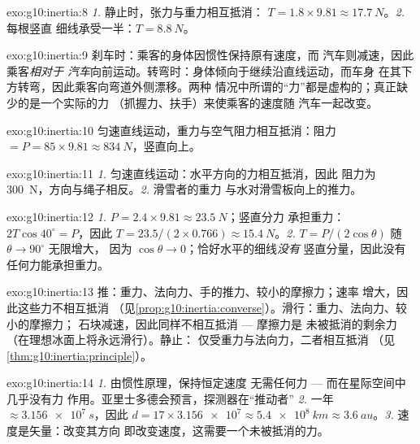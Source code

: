 \begin{solution}{exo:g10:inertia:8}
\emph{1.} 静止时，张力与重力相互抵消：
$T = 1.8 \times 9.81 \approx \qty{17.7}{N}$。\emph{2.} 每根竖直
细线承受一半：$T = \qty{8.8}{N}$。
\end{solution}

\begin{solution}{exo:g10:inertia:9}
刹车时：乘客的身体因惯性保持原有速度，而
汽车则减速，因此乘客\emph{相对于
汽车}向前运动。转弯时：身体倾向于继续沿直线运动，而车身
在其下方转弯，因此乘客向弯道外侧漂移。两种
情况中所谓的“力”都是虚构的；真正缺少的是一个实际的力
（抓握力、扶手）来使乘客的速度随
汽车一起改变。
\end{solution}

\begin{solution}{exo:g10:inertia:10}
匀速直线运动，重力与空气阻力相互抵消：阻力
$= P = 85 \times 9.81 \approx \qty{834}{N}$，竖直向上。
\end{solution}

\begin{solution}{exo:g10:inertia:11}
\emph{1.} 匀速直线运动：水平方向的力相互抵消，因此
阻力为 \qty{300}{N}，方向与绳子相反。\emph{2.} 滑雪者的重力
与水对滑雪板向上的推力。
\end{solution}

\begin{solution}{exo:g10:inertia:12}
\emph{1.} $P = 2.4 \times 9.81 \approx \qty{23.5}{N}$；竖直分力
承担重力：$2T\cos 40^\circ = P$，因此
$T = 23.5/(2 \times 0.766) \approx \qty{15.4}{N}$。\emph{2.}
$T = P/(2\cos\theta)$ 随 $\theta \to 90^\circ$ 无限增大，
因为 $\cos\theta \to 0$；恰好水平的细线\emph{没有}
竖直分量，因此没有任何力能承担重力。
\end{solution}

\begin{solution}{exo:g10:inertia:13}
推：重力、法向力、手的推力、较小的摩擦力；速率
增大，因此这些力不相互抵消
（见\cref{prop:g10:inertia:converse}）。滑行：重力、法向力、较小的摩擦力；
石块减速，因此同样不相互抵消 --- 摩擦力是
未被抵消的剩余力（在理想冰面上将永远滑行）。静止：
仅受重力与法向力，二者相互抵消
（见\cref{thm:g10:inertia:principle}）。
\end{solution}

\begin{solution}{exo:g10:inertia:14}
\emph{1.} 由惯性原理，保持恒定速度
无需任何力 --- 而在星际空间中几乎没有力
作用。亚里士多德会预言，探测器在“推动者”
\emph{2.} 一年 $\approx \qty{3.156e7}{s}$，因此
$d = 17 \times \num{3.156e7} \approx \qty{5.4e8}{km} \approx
\qty{3.6}{au}$。\emph{3.} 速度是矢量：改变其方向
即改变速度，这需要一个未被抵消的力。
\end{solution}

